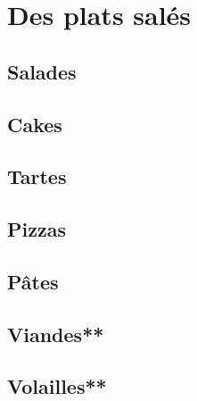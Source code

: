\documentclass[A4paper,twoside, 12pt]{book}
\begin{document}
\frontmatter
\tableofcontents 		%
\mainmatter

\part{Des plats salés}
	\chapter{Salades}



		
	\chapter{Cakes}



	
	
	\chapter{Tartes}


	


	\chapter{Pizzas}
	\chapter{Pâtes}
	
	\chapter{Viandes**}






	\chapter{Volailles**}






	
\end{document}
